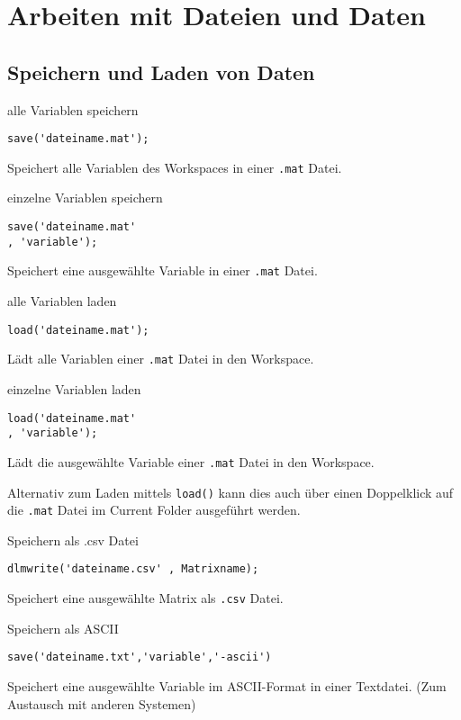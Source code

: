  \section{Arbeiten mit Dateien und Daten}
        \subsection{Speichern und Laden von Daten}
        \begin{CodeErklaerungBox}{alle Variablen speichern}
              \begin{lstlisting}
save('dateiname.mat');
              \end{lstlisting}
              \tcblower
              Speichert alle Variablen des Workspaces in einer \texttt{.mat} Datei.
        \end{CodeErklaerungBox}
        \begin{CodeErklaerungBox}{einzelne Variablen speichern}
              \begin{lstlisting}
save('dateiname.mat' 
, 'variable');
              \end{lstlisting}
              \tcblower
              Speichert eine ausgewählte Variable in einer \texttt{.mat} Datei.
        \end{CodeErklaerungBox}
                \begin{CodeErklaerungBox}{alle Variablen laden}
              \begin{lstlisting}
load('dateiname.mat');
              \end{lstlisting}
              \tcblower
              Lädt alle Variablen einer \texttt{.mat} Datei in den Workspace.
        \end{CodeErklaerungBox}
        \begin{CodeErklaerungBox}{einzelne Variablen laden}
              \begin{lstlisting}
load('dateiname.mat' 
, 'variable');
              \end{lstlisting}
              \tcblower
              Lädt die ausgewählte Variable einer \texttt{.mat} Datei in den Workspace.
        \end{CodeErklaerungBox}
       \noindent Alternativ zum Laden mittels \texttt{load()} kann dies auch über einen Doppelklick auf die \texttt{.mat} Datei im Current Folder ausgeführt werden.
       \begin{CodeErklaerungBox}{Speichern als .csv Datei}
              \begin{lstlisting}
dlmwrite('dateiname.csv' , Matrixname);
              \end{lstlisting}
              \tcblower
              Speichert eine ausgewählte Matrix als \texttt{.csv} Datei.
        \end{CodeErklaerungBox}
        \begin{CodeErklaerungBox}{Speichern als ASCII}
              \begin{lstlisting}
save('dateiname.txt','variable','-ascii')
              \end{lstlisting}
              \tcblower
              Speichert eine ausgewählte Variable im ASCII-Format in einer Textdatei. (Zum Austausch mit anderen Systemen)
        \end{CodeErklaerungBox}
